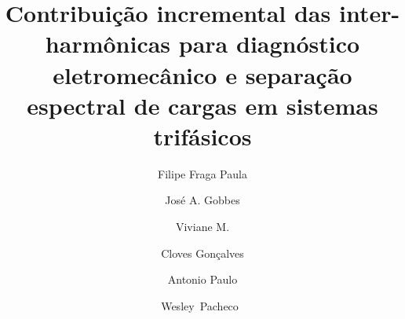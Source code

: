 \documentclass[times,final]{elsarticle}
\begin{document}
\begin{frontmatter}
\title{Contribuição incremental das inter-harmônicas para diagnóstico eletromecânico e separação espectral de cargas em sistemas trifásicos}


\author[1,4,5]{Filipe Fraga Paula }
\author[1,4,5]{José A. Gobbes }
\author[1,3,4]{Viviane M. }
\author[3]{Cloves Gonçalves }
\author[2]{Antonio Paulo }
\author[1,2,5]{Wesley~Pacheco~}

\address[1]{Electrical, Mechanical \& Computer Engineering School, Federal University of Goias, Goiania, Goias/Brazil. PC~74.605-010}
\address[2]{Institute of Systems and Robotics, Coimbra University, Coimbra/Portugal. PC~3030-290}
\address[3]{Polytechnic and Arts School, Pontifical Catholic University of Goias, Goiania, Goias/Brazil. PC~74.605-010}
\address[4]{Agroindustrial Automation and Precision Agriculture (AutoAgri), Federal Institute Goiano, Postal code: 75389-269, Trindade/Brazil}
\address[5]{Technology Research and Development Center, Federal Institute of Goias, Goiania, Goias/Brazil, PC~75.250-000}

\received{\today}


\end{frontmatter}
\end{document}
